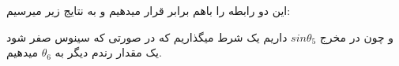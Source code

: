 \documentclass{article}
\begin{document}
\noindent
این دو رابطه را باهم برابر قرار میدهیم و به نتایج زیر میرسیم:
\begin{figure}[H]%
	\centering
    \caption{\label{fig:formula213}}
\end{figure}
\noindent
و چون در مخرج $sin \theta_5$ داریم یک شرط میگذاریم که در صورتی که سینوس صفر شود یک مقدار رندم دیگر به $\theta_6$ میدهیم.
\end{document}
